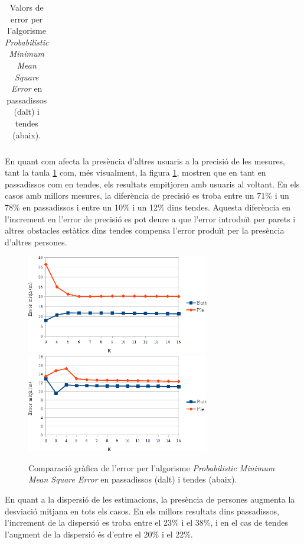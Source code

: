 \begin{table}[h]
\begin{center}
\begin{tabular}{|l|c|c|c|}
      \end{tabular}
      
   \end{center}
\caption{Valors de error per l'algorisme \textit{Probabilistic Minimum Mean Square Error} en passadissos (dalt) i tendes (abaix).}
\label{tab:error_MMSE}
\end{table}

En quant com afecta la presència d'altres usuaris a la precisió de les mesures, tant la taula \ref{tab:error_MMSE} com, més visualment, la figura \ref{fig:grafic_MMSE}, mostren que en tant en passadissos com en tendes, els resultats empitjoren amb usuaris al voltant. En els casos amb millors mesures, la diferència de precisió es troba entre un 71\% i un 78\% en passadissos i entre un 10\% i un 12\% dins tendes. Aquesta diferència en l'increment en l'error de precisió es pot deure a que l'error introduït per parets i altres obstacles estàtics dins tendes compensa l'error produït per la presència d'altres persones.

\begin{figure}[ht]
\begin{center}
\includegraphics[width=8cm]{imatges/mmse_passadis.png}
\includegraphics[width=8cm]{imatges/mmse_tenda.png}
\caption{Comparació gràfica de l'error per l'algorisme \textit{Probabilistic Minimum Mean Square Error} en passadissos (dalt) i tendes (abaix).}
\label{fig:grafic_MMSE}
\end{center}
\end{figure}

En quant a la dispersió de les estimacions, la presència de persones augmenta la desviació mitjana en tots els casos. En els millors resultats dins passadissos, l'increment de la dispersió es troba entre el 23\% i el 38\%, i en el cas de tendes l'augment de la dispersió és d'entre el 20\% i el 22\%.
